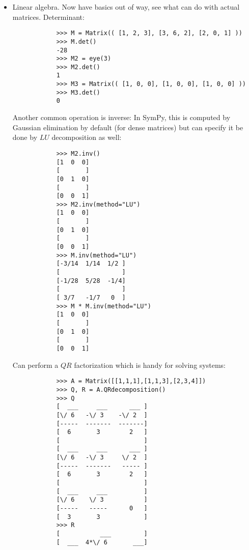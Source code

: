 \documentclass{article}
\begin{document}
\begin{itemize}
\begin{itemize}
\begin{verbatim}
			[       ]
			[-1   x ]			
		\end{verbatim}
		1 more useful matrix-wide entry application function: substitution function. Declare a matrix with symbolic entries then substitute a value. Remember: can substitute anything -- even another symbol!
		\begin{verbatim}
			>>> from sympy import Symbol
			>>> x = Symbol('x')
			>>> M = eye(3) * x
			>>> M
			[x  0  0]
			[       ]
			[0  x  0]
			[       ]
			[0  0  x]
			>>> M.subs(x, 4)
			[4  0  0]
			[       ]
			[0  4  0]
			[       ]
			[0  0  4]
			>>> y = Symbol('y')
			>>> M.subs(x, y)
			[y  0  0]
			[       ]
			[0  y  0]
			[       ]
			[0  0  y]
		\end{verbatim}
		\item {\sf Linear algebra.} Now have basics out of way, see what can do with actual matrices. Determinant:
		\begin{verbatim}
			>>> M = Matrix(( [1, 2, 3], [3, 6, 2], [2, 0, 1] ))
			>>> M.det()
			-28
			>>> M2 = eye(3)
			>>> M2.det()
			1
			>>> M3 = Matrix(( [1, 0, 0], [1, 0, 0], [1, 0, 0] ))
			>>> M3.det()
			0
		\end{verbatim}
		Another common operation is inverse: In SymPy, this is computed by Gaussian elimination by default (for dense matrices) but can specify it be done by $LU$ decomposition as well:
		\begin{verbatim}
			>>> M2.inv()
			[1  0  0]
			[       ]
			[0  1  0]
			[       ]
			[0  0  1]
			>>> M2.inv(method="LU")
			[1  0  0]
			[       ]
			[0  1  0]
			[       ]
			[0  0  1]
			>>> M.inv(method="LU")
			[-3/14  1/14  1/2 ]
			[                 ]
			[-1/28  5/28  -1/4]
			[                 ]
			[ 3/7   -1/7   0  ]
			>>> M * M.inv(method="LU")
			[1  0  0]
			[       ]
			[0  1  0]
			[       ]
			[0  0  1]
		\end{verbatim}
		Can perform a $QR$ factorization which is handy for solving systems:
		\begin{verbatim}
			>>> A = Matrix([[1,1,1],[1,1,3],[2,3,4]])
			>>> Q, R = A.QRdecomposition()
			>>> Q
			[  ___     ___      ___ ]
			[\/ 6   -\/ 3    -\/ 2  ]
			[-----  -------  -------]
			[  6       3        2   ]
			[                       ]
			[  ___     ___      ___ ]
			[\/ 6   -\/ 3     \/ 2  ]
			[-----  -------   ----- ]
			[  6       3        2   ]
			[                       ]
			[  ___     ___          ]
			[\/ 6    \/ 3           ]
			[-----   -----      0   ]
			[  3       3            ]
			>>> R
			[           ___         ]
			[  ___  4*\/ 6       ___]

\end{verbatim}
\end{itemize}
\end{itemize}
\end{document}
